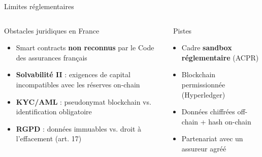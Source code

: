 \documentclass[aspectratio=169, 10pt, t]{beamer}
\begin{document}
\begin{frame}{Limites réglementaires}
  \begin{columns}[c]
      \begin{alertblock}{Obstacles juridiques en France}
        \begin{itemize}
          \setlength{\itemsep}{6pt}
          \item[\textcolor{AlertRed}{\faGavel}] Smart contracts \textbf{non reconnus}
            par le Code des assurances français
          \item[\textcolor{AlertRed}{\faUniversity}] \textbf{Solvabilité II} :
            exigences de capital incompatibles avec les réserves on-chain
          \item[\textcolor{AlertRed}{\faIdCard}] \textbf{KYC/AML} :
            pseudonymat blockchain vs. identification obligatoire
          \item[\textcolor{AlertRed}{\faUserShield}] \textbf{RGPD} :
            données immuables vs. droit à l'effacement (art. 17)
        \end{itemize}
      \end{alertblock}
      \begin{exampleblock}{\small\faLightbulb\ Pistes}
        \small
        \begin{itemize}
          \setlength{\itemsep}{4pt}
          \item Cadre \textbf{sandbox réglementaire} (ACPR)
          \item Blockchain permissionnée (Hyperledger)
          \item Données chiffrées off-chain + hash on-chain
          \item Partenariat avec un assureur agréé
        \end{itemize}
      \end{exampleblock}
  \end{columns}
\end{frame}
\end{document}
